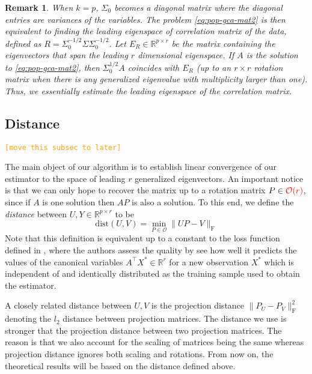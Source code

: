 \documentclass[11pt]{article}
\newcommand{\nb}[1]{\textcolor{orange}{\texttt{[#1]}}}
\newcommand{\red}{\color{red}}
\newcommand{\0}{{\mathbf{0}}}
\newtheorem{remark}[theorem]{Remark}
\begin{document}
\begin{remark}
      \label{rmk:pca}
When $k=p$, $\Sigma_0$ becomes a diagonal matrix where the diagonal entries are variances of the variables.
The problem \eqref{eq:pop-gca-mat2} is then equivalent to finding the leading eigenspace of correlation matrix of the data, defined as $R =\Sigma_0^{-1/2}\Sigma\Sigma_0^{-1/2}$. 
Let $E_R\in\mathbb{R}^{p\times r}$ be the matrix containing the eigenvectors that span the leading $r$ dimensional eigenspace. 
If $A$ is the solution to \eqref{eq:pop-gca-mat2}, then $\Sigma_0^{1/2}A$ coincides with $E_R$ (up to an $r\times r$ rotation matrix when there is any generalized eigenvalue with multiplicity larger than one). 
Thus, we essentially estimate the leading eigenspace of the correlation matrix.
\end{remark}



\iffalse
\subsection{Distance}
  
\nb{move this subsec to later}

The main object of our algorithm is to establish linear convergence of our estimator to the space of leading $r$ generalized eigenvectors. An important notice is that we can only hope to recover the matrix up to a rotation matrix $P\in{\red\mathcal{O}(r)}$, since if $A$ is one solution then $AP$ is also a solution. To this end, we define the \textit{distance} between $U,Y\in\mathbb{R}^{p\times r}$ to be 
\begin{equation}
\mathrm{dist}(U,V)=\min_{P\in\mathcal{O}}\|UP-V\|_\mathrm{F}
\end{equation}
Note that this definition is equivalent up to a constant to the loss function defined in \cite{gao2017sparse}, where the authors assess the quality by see how well
it predicts the values of the canonical variables $A^\top X^*\in \mathbb{R}^r$
for a new observation $X^*$ which
is independent of and identically distributed as the training sample used to obtain the estimator.
\par  A closely related distance between $U,V$ is the projection distance $\|P_U-P_V\|_\mathrm{F}^2$ denoting the $l_2$ distance between projection matrices. The distance we use is stronger that the projection distance between two projection matrices. The reason is that we also account for the scaling of matrices being the same whereas projection distance ignores both scaling and rotations. From now on, the theoretical results will be based on the distance defined above. 
\end{document}
